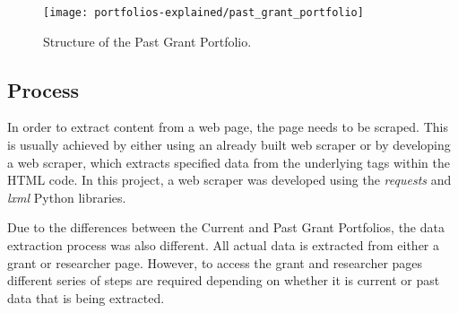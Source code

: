 \begin{figure}[htpb]
    \centering
    \texttt{[image: portfolios-explained/past\_grant\_portfolio]}
    \caption{Structure of the Past Grant Portfolio.}
    \label{fig:past_grant_portfolio}
\end{figure}
\fi

\iffalse
\subsection{Issues}

For each record, the web scraper has to make a web request, similar to when a user navigates to a web page, and then extract the specified data. For example, to extract data from all current grant records, 3, 175 requests need to be performed. This may not be too problematic, however, for grant data between 2010 and 2000, 18,692 requests are required. Now, that is problematic. Therefore, during the initial process of data extraction, this problem was identified, as the computational time of the past data extraction process was far too lengthy.

Several alternatives were identified as potential solutions to the problem. The scraper could be modified to make asynchronous requests or the physical HTML files could be downloaded and then scraped locally. The latter alternative was chosen, and a script was written in Bash in order to achieve it. This decision was successful and it greatly improved the computational time of the data extraction task.
\fi

\iffalse
\subsection{Process}

In order to extract content from a web page, the page needs to be scraped. This is usually achieved by either using an already built web scraper or by developing a web scraper, which extracts specified data from the underlying tags within the HTML code. In this project, a web scraper was developed using the \textit{requests} and \textit{lxml} Python libraries.

Due to the differences between the Current and Past Grant Portfolios, the data extraction process was also different. All actual data is extracted from either a grant or researcher page. However, to access the grant and researcher pages different series of steps are required depending on whether it is current or past data that is being extracted.

